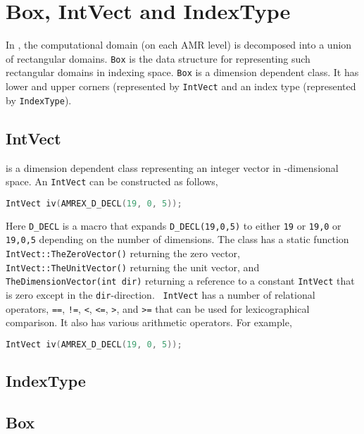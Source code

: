 \section{Box, IntVect and IndexType}
\label{sec:basics:box}

In \amrex, the computational domain (on each AMR level) is decomposed
into a union of rectangular domains.  {\tt Box} is the data
structure for representing such rectangular domains in indexing space.
{\tt Box} is a dimension dependent class.  It has lower and upper
corners (represented by {\tt IntVect} and an index type
(represented by {\tt IndexType}).

\subsection{IntVect}

{} is a dimension dependent class representing an
integer vector in {}-dimensional space.  An
{\tt IntVect} can be constructed as follows,
\begin{lstlisting}[language=cpp]
    IntVect iv(AMREX_D_DECL(19, 0, 5));
\end{lstlisting}
Here {\tt D\_DECL} is a macro that expands {\tt D\_DECL(19,0,5)} to
either {\tt 19} or {\tt 19,0} or {\tt 19,0,5} depending on the number
of dimensions.  The class has a static function {\tt
  IntVect::TheZeroVector()} returning the zero vector, {\tt
  IntVect::TheUnitVector()} returning the unit vector, and {\tt
  TheDimensionVector(int dir)} returning a reference to a constant
{\tt IntVect} that is zero except in the {\tt dir}-direction.  {\tt
  IntVect} has a number of relational operators, {\tt ==}, {\tt !=},
{\tt <}, {\tt <=}, {\tt >}, and {\tt >=} that can be used for
lexicographical comparison.  It also has various arithmetic operators.
For example,
\begin{lstlisting}[language=cpp]
    IntVect iv(AMREX_D_DECL(19, 0, 5));
\end{lstlisting}


\subsection{IndexType}

\subsection{Box}


